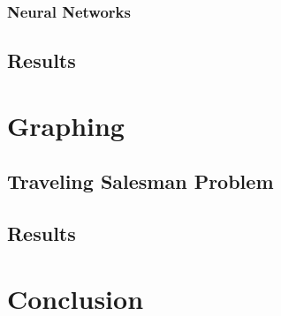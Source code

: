 \documentclass[bsc,frontabs,twoside,singlespacing,parskip,deptreport]{infthesis}     %
\begin{document}
\subsection{Neural Networks}

\section{Results}

\chapter{Graphing}
\section{Traveling Salesman Problem}

\section{Results}

\chapter{Conclusion}



\end{document}
